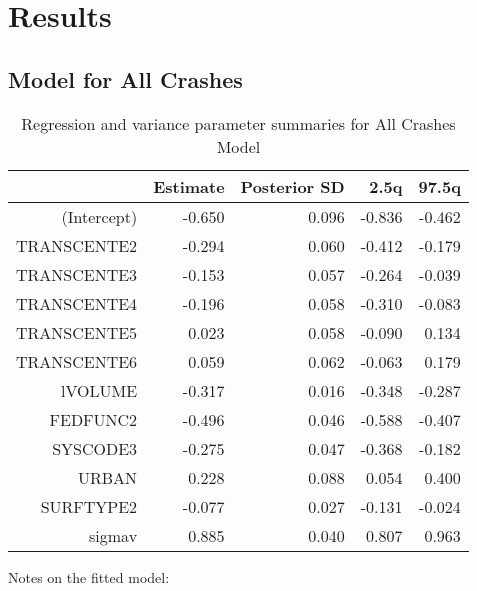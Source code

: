 \documentclass[a4paper]{article}\usepackage[]{graphicx}\usepackage[]{color}
\begin{document}
\clearpage
\section{Results}

\subsection{Model for All Crashes}


\begin{table}[h!]
\centering
\begin{tabular}{rrrrr}
  \hline
 & Estimate & Posterior SD & 2.5q & 97.5q \\ 
  \hline
(Intercept) & -0.650 & 0.096 & -0.836 & -0.462 \\ 
  TRANSCENTE2 & -0.294 & 0.060 & -0.412 & -0.179 \\ 
  TRANSCENTE3 & -0.153 & 0.057 & -0.264 & -0.039 \\ 
  TRANSCENTE4 & -0.196 & 0.058 & -0.310 & -0.083 \\ 
  TRANSCENTE5 & 0.023 & 0.058 & -0.090 & 0.134 \\ 
  TRANSCENTE6 & 0.059 & 0.062 & -0.063 & 0.179 \\ 
  lVOLUME & -0.317 & 0.016 & -0.348 & -0.287 \\ 
  FEDFUNC2 & -0.496 & 0.046 & -0.588 & -0.407 \\ 
  SYSCODE3 & -0.275 & 0.047 & -0.368 & -0.182 \\ 
  URBAN & 0.228 & 0.088 & 0.054 & 0.400 \\ 
  SURFTYPE2 & -0.077 & 0.027 & -0.131 & -0.024 \\ 
  sigmav & 0.885 & 0.040 & 0.807 & 0.963 \\ 
   \hline
\end{tabular}
\caption{Regression and variance parameter summaries for All Crashes Model} 
\label{allcrash}
\end{table}

Notes on the fitted model:
\end{document}
